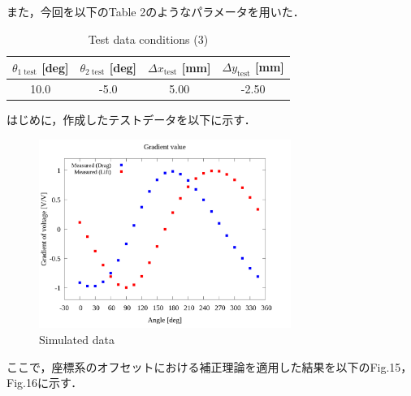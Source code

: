\documentclass[twocolumn,a4j]{jsarticle}
\begin{document}
また，今回を以下のTable 2のようなパラメータを用いた．

\begin{table}[htbp]
    \begin{center}
        \caption{Test data conditions (3)}
        \begin{tabular}{|p{20mm}|p{20mm}|p{20mm}|p{20mm}|}
            \hline
            \multicolumn{1}{|c|}{$\theta_{1\;\mathrm{test}}$ [deg]} & \multicolumn{1}{|c|}{$\theta_{2\;\mathrm{test}}$ [deg]} & \multicolumn{1}{|c|}{$\Delta x_\mathrm{test}$ [mm]} & \multicolumn{1}{|c|}{$\Delta y_\mathrm{test}$ [mm]} \\ \hline
            \multicolumn{1}{|c|}{10.0}                                & \multicolumn{1}{|c|}{-5.0}                               & \multicolumn{1}{|c|}{5.00}                                       & \multicolumn{1}{|c|}{-2.50}                       \\ \hline
        \end{tabular}
    \end{center}
\end{table}

はじめに，作成したテストデータを以下に示す．

\begin{figure}[htbp]
    \footnotesize
    \begin{center}
        \includegraphics[width=82mm]{../../../02_workspace/result/simulation_tx=10.0_ty=-5.0_dx=5.00_dy=-2.50/plot/05/05_summary-wave.png}
        \caption{Simulated data}
    \end{center}
\end{figure}

ここで，座標系のオフセットにおける補正理論を適用した結果を以下のFig.15，Fig.16に示す．
\end{document}
